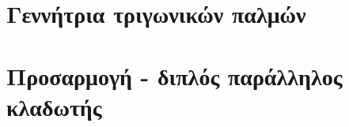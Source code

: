 \newcommand{\reporttitle}{Εργαστηριακές Ασκήσεις}
\newcommand{\reportauthorOne}{Καπετάνιος Αντώνιος}
\newcommand{\cidOne}{10417}
\newcommand{\reportauthorTwo}{Χαλκιάς Νικόλαος Μάριος}
\newcommand{\cidTwo}{}





	

	\tableofcontents
	\newpage

	\chapter{Γεννήτρια τριγωνικών παλμών}
		

	\chapter{Προσαρμογή - διπλός παράλληλος κλαδωτής}
		

	\printbibliography[title={Αναφορές}]

